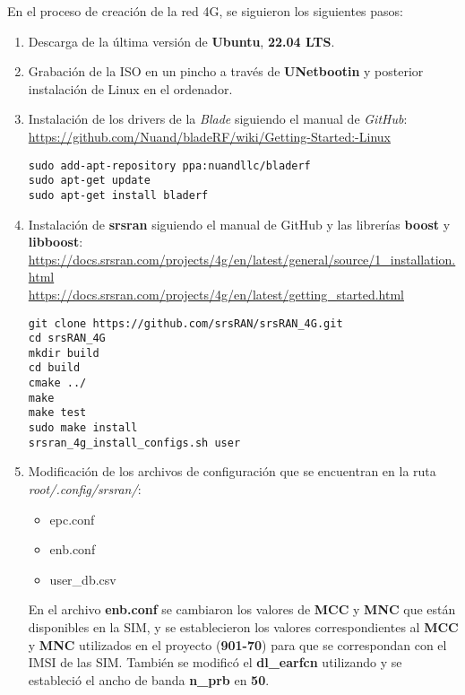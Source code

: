 En el proceso de creación de la red 4G, se siguieron los siguientes pasos:

\begin{enumerate}
\item Descarga de la última versión de \textbf{Ubuntu}, \textbf{22.04 LTS}.
\item Grabación de la ISO en un pincho a través de \textbf{UNetbootin} y posterior instalación de Linux en el ordenador.
\item Instalación de los drivers de la \textit{Blade} siguiendo el manual de \textit{GitHub}:\\
 \url{https://github.com/Nuand/bladeRF/wiki/Getting-Started:-Linux}

\begin{lstlisting}
sudo add-apt-repository ppa:nuandllc/bladerf
sudo apt-get update
sudo apt-get install bladerf
\end{lstlisting}

\item Instalación de \textbf{srsran} siguiendo el manual de GitHub y las librerías \textbf{boost} y \textbf{libboost}:\\
\url{https://docs.srsran.com/projects/4g/en/latest/general/source/1_installation.html}\\
\url{https://docs.srsran.com/projects/4g/en/latest/getting_started.html}

\begin{lstlisting}
git clone https://github.com/srsRAN/srsRAN_4G.git
cd srsRAN_4G
mkdir build
cd build
cmake ../
make
make test
sudo make install
srsran_4g_install_configs.sh user
\end{lstlisting}

\item Modificación de los archivos de configuración que se encuentran en la ruta \textit{root/.config/srsran/}:
\begin{itemize}
	\item epc.conf
	\item enb.conf
	\item user_db.csv
\end{itemize}

En el archivo \textbf{enb.conf} se cambiaron los valores de \textbf{MCC} y \textbf{MNC} que están disponibles en la SIM, y se establecieron los valores correspondientes al \textbf{MCC} y \textbf{MNC} utilizados en el proyecto (\textbf{901-70}) para que se correspondan con el IMSI de las SIM. También se modificó el \textbf{dl_earfcn} utilizando \cite{earn} y se estableció el ancho de banda \textbf{n_prb} en \textbf{50}.\\


\end{enumerate}
